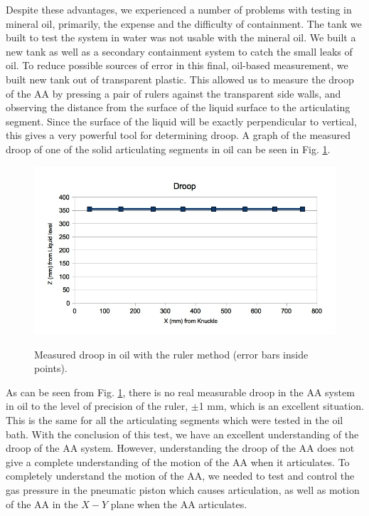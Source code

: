 Despite these advantages, we experienced a number of problems with testing in mineral oil, primarily, the expense and the difficulty of containment. The tank we built to test the system in water was not usable with the mineral oil. We built a new tank as well as a secondary containment system to catch the small leaks of oil. To reduce possible sources of error in this final, oil-based measurement, we built new tank out of transparent plastic. This allowed us to measure the droop of the AA by pressing a pair of rulers against the transparent side walls, and observing the distance from the surface of the liquid surface to the articulating segment. Since the surface of the liquid will be exactly perpendicular to vertical, this gives a very powerful tool for determining droop.  A graph of the measured droop of one of the solid articulating segments in oil can be seen in Fig. \ref{Oil_Droop}.

\begin{figure}
\caption{Measured droop in oil with the ruler method (error bars inside points).}
\includegraphics[width=\textwidth]{AA/Oil_Droop_Ruler.jpg}
\label{Oil_Droop}
\end{figure}

As can be seen from Fig. \ref{Oil_Droop}, there is no real measurable droop in the AA system in oil to the level of precision of the ruler, $\pm$1 mm, which is an excellent situation. This is the same for all the articulating segments which were tested in the oil bath. With the conclusion of this test, we have an excellent understanding of the droop of the AA system. However, understanding the droop of the AA does not give a complete understanding of the motion of the AA when it articulates. To completely understand the motion of the AA, we needed to test and control the gas pressure in the pneumatic piston which causes articulation, as well as motion of the AA in the $X-Y$ plane when the AA articulates. 


